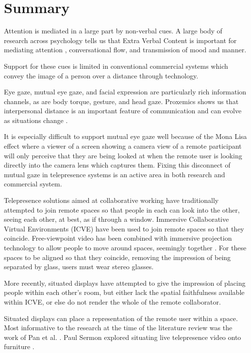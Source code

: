 \section{Summary}
Attention is mediated in a large part by non-verbal cues. A large body of research across psychology tells us that Extra Verbal Content is important \cite{Goodwin2000a} for mediating attention \cite{Stiefelhagen2001, Sellen1992, Stiefelhagen2002, Deckers2013, Gibson1963, Bente1998, Slessor2008, Argyle, Hofmann20061683, Pan2008a, Vertegaal1997}, conversational flow, and transmission of mood and manner.\par
Support for these cues is limited in conventional commercial systems which convey the image of a person over a distance through technology. \par
Eye gaze, mutual eye gaze, and facial expression \cite{Hager1979, Argyle, ohba1998facial} are particularly rich information channels, as are body torque, gesture, and head gaze. Proxemics shows us that interpersonal distance is an important feature of communication and can evolve as situations change \cite{Hall1969}.\par
It is especially difficult to support mutual eye gaze well because of the Mona Lisa effect where a viewer of a screen showing a camera view of a remote participant will only perceive that they are being looked at when the remote user is looking directly into the camera lens which captures them. Fixing this disconnect of mutual gaze in telepresence systems is an active area in both research and commercial system. \par
Telepresence solutions aimed at collaborative working have traditionally attempted to join remote spaces so that people in each can look into the other, seeing each other, at best, as if through a window. Immersive Collaborative Virtual Environments (ICVE) have been used to join remote spaces so that they coincide. Free-viewpoint video has been combined with immersive projection technology to allow people to move around spaces, seemingly together \cite{Roberts2015}. For these spaces to be aligned so that they coincide, removing the impression of being separated by glass, users must wear stereo glasses. \par
More recently, situated displays have attempted to give the impression of placing people within each other's room, but either lack the spatial faithfulness available within ICVE, or else do not render the whole of the remote collaborator.  \par
Situated displays can place a representation of the remote user within a space. Most informative to the research at the time of the literature review was the work of Pan et al. \cite{Oyekoya2012, pan2014comparing, Pan2012a, Pan2014a}. Paul Sermon explored situating live telepresence video onto furniture \cite{Sermon2000}.  \par
